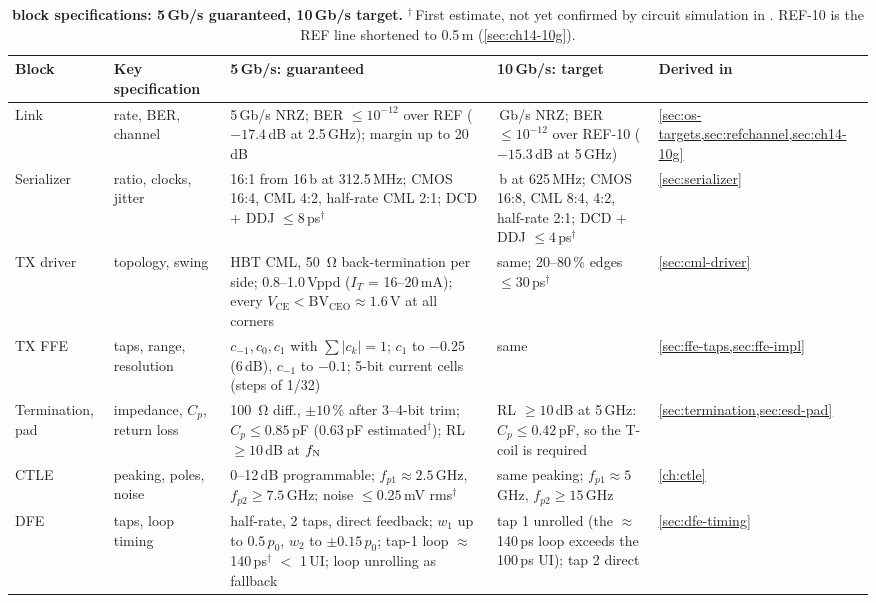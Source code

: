 \begin{table}[!tbp]
\centering
\caption{\textbf{\OS{} block specifications: 5\,Gb/s guaranteed, 10\,Gb/s target.} $^\dagger$\,First estimate, not yet confirmed by circuit simulation in \sgx{}. REF-10 is the REF line shortened to 0.5\,m (\cref{sec:ch14-10g}).}
\label{tab:specs}
\scriptsize
\renewcommand{\arraystretch}{1.1}
\setlength{\tabcolsep}{3.2pt}
\begin{tabularx}{\linewidth}{@{}>{\raggedright\arraybackslash}p{15.5mm} >{\raggedright\arraybackslash}p{16.5mm} L >{\raggedright\arraybackslash}p{37mm} >{\raggedright\arraybackslash}p{16.5mm}@{}}
\toprule
\textbf{Block} & \textbf{Key specification} & \textbf{5\,Gb/s: guaranteed} & \textbf{10\,Gb/s: target} & \textbf{Derived in}\\
\midrule
Link & rate, BER, channel & 5\,Gb/s NRZ; BER $\le10^{-12}$ over REF ($-17.4$\,dB at 2.5\,GHz); margin up to 20\,dB & 10\,Gb/s NRZ; BER $\le10^{-12}$ over REF-10 ($-15.3$\,dB at 5\,GHz) & \cref{sec:os-targets,sec:refchannel,sec:ch14-10g}\\
Serializer & ratio, clocks, jitter & 16:1 from 16\,b at 312.5\,MHz; CMOS 16:4, CML 4:2, half-rate CML 2:1; DCD + DDJ $\le8$\,ps$^\dagger$ & 16\,b at 625\,MHz; CMOS 16:8, CML 8:4, 4:2, half-rate 2:1; DCD + DDJ $\le4$\,ps$^\dagger$ & \cref{sec:serializer}\\
TX driver & topology, swing & HBT CML, \qty{50}{\ohm} back-termination per side; 0.8--1.0\,Vppd ($I_T$ = 16--20\,mA); every $V_\mathrm{CE}<\mathrm{BV}_\mathrm{CEO}\approx1.6$\,V at all corners & same; 20--80\,\% edges $\le30$\,ps$^\dagger$ & \cref{sec:cml-driver}\\
TX FFE & taps, range, resolution & $c_{-1}, c_0, c_1$ with $\sum\lvert c_k\rvert=1$; $c_1$ to $-0.25$ (6\,dB), $c_{-1}$ to $-0.1$; 5-bit current cells (steps of 1/32) & same & \cref{sec:ffe-taps,sec:ffe-impl}\\
Termination, pad & impedance, $C_p$, return loss & \qty{100}{\ohm} diff., $\pm10$\,\% after 3--4-bit trim; $C_p\le0.85$\,pF (0.63\,pF estimated$^\dagger$); RL $\ge10$\,dB at $f_\mathrm{N}$ & RL $\ge10$\,dB at 5\,GHz: $C_p\le0.42$\,pF, so the T-coil is required & \cref{sec:termination,sec:esd-pad}\\
CTLE & peaking, poles, noise & 0--12\,dB programmable; $f_{p1}\approx2.5$\,GHz, $f_{p2}\ge7.5$\,GHz; noise $\le0.25$\,mV rms$^\dagger$ & same peaking; $f_{p1}\approx5$\,GHz, $f_{p2}\ge15$\,GHz & \cref{ch:ctle}\\
DFE & taps, loop timing & half-rate, 2 taps, direct feedback; $w_1$ up to $0.5\,p_0$, $w_2$ to $\pm0.15\,p_0$; tap-1 loop $\approx$140\,ps$^\dagger$ $<$ 1\,UI; loop unrolling as fallback & tap 1 unrolled (the $\approx$140\,ps loop exceeds the 100\,ps UI); tap 2 direct & \cref{sec:dfe-timing}\\

\end{tabularx}
\end{table}
